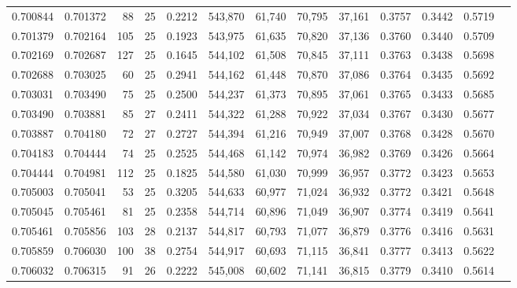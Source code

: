 \begin{tabular}{rrrrrrrrrrrrr}
0.700844 & 0.701372 &    88 &  25 &                                     0.2212 & 543,870 &  61,740 &  70,795 &  37,161 & 0.3757 & 0.3442 & 0.5719 \\
0.701379 & 0.702164 &   105 &  25 &                                     0.1923 & 543,975 &  61,635 &  70,820 &  37,136 & 0.3760 & 0.3440 & 0.5709 \\
0.702169 & 0.702687 &   127 &  25 &                                     0.1645 & 544,102 &  61,508 &  70,845 &  37,111 & 0.3763 & 0.3438 & 0.5698 \\
0.702688 & 0.703025 &    60 &  25 &                                     0.2941 & 544,162 &  61,448 &  70,870 &  37,086 & 0.3764 & 0.3435 & 0.5692 \\
0.703031 & 0.703490 &    75 &  25 &                                     0.2500 & 544,237 &  61,373 &  70,895 &  37,061 & 0.3765 & 0.3433 & 0.5685 \\
0.703490 & 0.703881 &    85 &  27 &                                     0.2411 & 544,322 &  61,288 &  70,922 &  37,034 & 0.3767 & 0.3430 & 0.5677 \\
0.703887 & 0.704180 &    72 &  27 &                                     0.2727 & 544,394 &  61,216 &  70,949 &  37,007 & 0.3768 & 0.3428 & 0.5670 \\
0.704183 & 0.704444 &    74 &  25 &                                     0.2525 & 544,468 &  61,142 &  70,974 &  36,982 & 0.3769 & 0.3426 & 0.5664 \\
0.704444 & 0.704981 &   112 &  25 &                                     0.1825 & 544,580 &  61,030 &  70,999 &  36,957 & 0.3772 & 0.3423 & 0.5653 \\
0.705003 & 0.705041 &    53 &  25 &                                     0.3205 & 544,633 &  60,977 &  71,024 &  36,932 & 0.3772 & 0.3421 & 0.5648 \\
0.705045 & 0.705461 &    81 &  25 &                                     0.2358 & 544,714 &  60,896 &  71,049 &  36,907 & 0.3774 & 0.3419 & 0.5641 \\
0.705461 & 0.705856 &   103 &  28 &                                     0.2137 & 544,817 &  60,793 &  71,077 &  36,879 & 0.3776 & 0.3416 & 0.5631 \\
0.705859 & 0.706030 &   100 &  38 &                                     0.2754 & 544,917 &  60,693 &  71,115 &  36,841 & 0.3777 & 0.3413 & 0.5622 \\
0.706032 & 0.706315 &    91 &  26 &                                     0.2222 & 545,008 &  60,602 &  71,141 &  36,815 & 0.3779 & 0.3410 & 0.5614 \\

\end{tabular}
